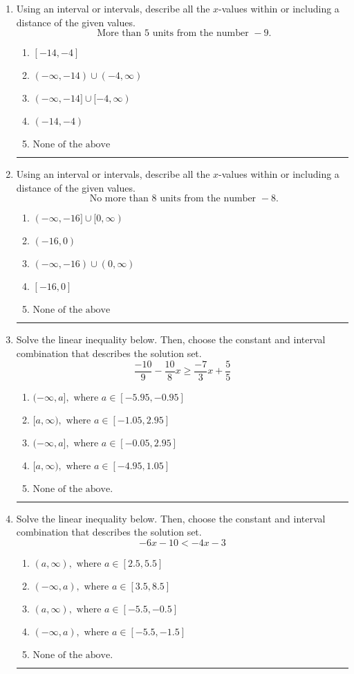 \documentclass[14pt]{extbook}
\newcommand{\litem}[1]{\item#1\hspace*{-1cm}\rule{\textwidth}{0.4pt}}
\begin{document}
\begin{enumerate}
{\begin{enumerate}[label=\Alph*.]
\end{enumerate} }
\litem{
Using an interval or intervals, describe all the $x$-values within or including a distance of the given values.\[ \text{ More than } 5 \text{ units from the number } -9. \]\begin{enumerate}[label=\Alph*.]
\item \( [-14, -4] \)
\item \( (-\infty, -14) \cup (-4, \infty) \)
\item \( (-\infty, -14] \cup [-4, \infty) \)
\item \( (-14, -4) \)
\item \( \text{None of the above} \)

\end{enumerate} }
\litem{
Using an interval or intervals, describe all the $x$-values within or including a distance of the given values.\[ \text{ No more than } 8 \text{ units from the number } -8. \]\begin{enumerate}[label=\Alph*.]
\item \( (-\infty, -16] \cup [0, \infty) \)
\item \( (-16, 0) \)
\item \( (-\infty, -16) \cup (0, \infty) \)
\item \( [-16, 0] \)
\item \( \text{None of the above} \)

\end{enumerate} }
\litem{
Solve the linear inequality below. Then, choose the constant and interval combination that describes the solution set.\[ \frac{-10}{9} - \frac{10}{8} x \geq \frac{-7}{3} x + \frac{5}{5} \]\begin{enumerate}[label=\Alph*.]
\item \( (-\infty, a], \text{ where } a \in [-5.95, -0.95] \)
\item \( [a, \infty), \text{ where } a \in [-1.05, 2.95] \)
\item \( (-\infty, a], \text{ where } a \in [-0.05, 2.95] \)
\item \( [a, \infty), \text{ where } a \in [-4.95, 1.05] \)
\item \( \text{None of the above}. \)

\end{enumerate} }
\litem{
Solve the linear inequality below. Then, choose the constant and interval combination that describes the solution set.\[ -6x -10 < -4x -3 \]\begin{enumerate}[label=\Alph*.]
\item \( (a, \infty), \text{ where } a \in [2.5, 5.5] \)
\item \( (-\infty, a), \text{ where } a \in [3.5, 8.5] \)
\item \( (a, \infty), \text{ where } a \in [-5.5, -0.5] \)
\item \( (-\infty, a), \text{ where } a \in [-5.5, -1.5] \)
\item \( \text{None of the above}. \)

\end{enumerate} }
\end{enumerate}
\end{document}
